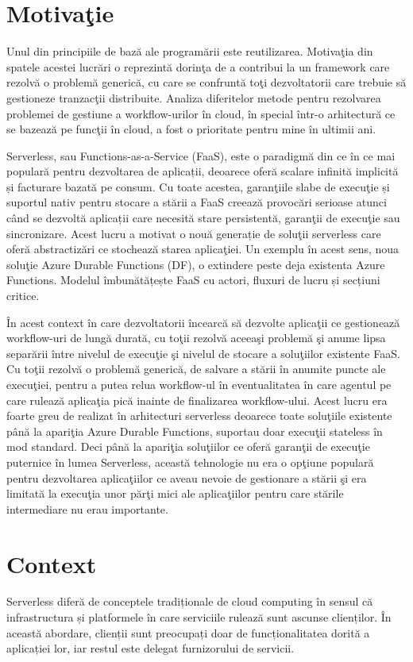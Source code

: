 \section{Motivaţie}
\quad Unul din principiile de bază ale programării este reutilizarea. Motivaţia din spatele acestei lucrări o reprezintă dorinţa de a contribui la un framework care rezolvă o problemă generică, cu care se confruntă toţi dezvoltatorii care trebuie să gestioneze tranzacţii distribuite. Analiza diferitelor metode pentru rezolvarea problemei de gestiune a workflow-urilor în cloud, în special într-o arhitectură ce se bazează pe funcţii în cloud, a fost o prioritate pentru mine în ultimii ani. 
\par
Serverless, sau Functions-as-a-Service (FaaS), este o paradigmă din ce în ce mai populară pentru dezvoltarea de aplicații, deoarece oferă scalare infinită implicită și facturare bazată pe consum. Cu toate acestea, garanţiile slabe de execuţie și suportul nativ pentru stocare a stării a FaaS creează provocări serioase atunci când se dezvoltă aplicații care necesită stare persistentă, garanţii de execuţie sau sincronizare. Acest lucru a motivat o nouă generație de soluţii serverless care oferă abstractizări ce stochează starea aplicaţiei. Un exemplu în acest sens, noua soluţie Azure Durable Functions (DF), o extindere peste deja existenta Azure Functions. Modelul îmbunătățește FaaS cu actori, fluxuri de lucru și secțiuni critice.
\par
În acest context în care dezvoltatorii încearcă să dezvolte aplicaţii ce gestionează workflow-uri  de lungă durată, cu toţii rezolvă aceeaşi problemă şi anume lipsa separării între nivelul de execuţie şi nivelul de stocare a soluţiilor existente FaaS. Cu toţii rezolvă o problemă generică, de salvare a stării în anumite puncte ale execuţiei, pentru a putea relua workflow-ul în eventualitatea în care agentul pe care rulează aplicaţia pică inainte de finalizarea workflow-ului. Acest lucru era foarte greu de realizat în arhitecturi serverless deoarece toate soluţiile existente până la apariţia Azure Durable Functions, suportau doar execuţii stateless în mod standard. Deci până la apariţia soluţiilor ce oferă garanţii de execuţie puternice în lumea Serverless, această tehnologie nu era o opţiune populară pentru dezvoltarea aplicaţiilor ce aveau nevoie de gestionare a stării şi era limitată la execuţia unor părţi mici ale aplicaţiilor pentru care stările intermediare nu erau importante. 
\section{Context}
\quad Serverless diferă de conceptele tradiționale de cloud computing în sensul că infrastructura și platformele în care serviciile rulează sunt ascunse clienților. În această abordare, clienții sunt preocupați doar de funcționalitatea dorită a aplicației lor, iar restul este delegat furnizorului de servicii. \par

